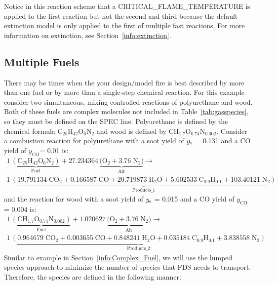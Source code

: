 \documentclass[11pt]{book}
\begin{document}
Notice in this reaction scheme that a {\ct CRITICAL\_FLAME\_TEMPERATURE} is applied to the first reaction but not the second and third because the default extinction model is only applied to the first of multiple fast reactions. For more information on extinction, see Section~\ref{info:extinction}.



\subsection{Multiple Fuels}
\label{info:multi-reac}
\label{energy_budget_adiabatic_two_fuels}

There may be times when the your design/model fire is best described by more than one fuel or by more than a single-step chemical reaction. For this example consider two simultaneous, mixing-controlled reactions of polyurethane and wood. Both of these fuels are complex molecules not included in Table~\ref{tab:gasspecies}, so they must be defined on the {\ct SPEC line}. Polyurethane is defined by the chemical formula C$_{25}$H$_{42}$O$_{6}$N$_{2}$ and wood is defined by CH$_{1.7}$O$_{0.74}$N$_{0.002}$. Consider a combustion reaction for polyurethane with a soot yield of $y_{\rm s}$ = 0.131 and a CO yield of $y_{\mathrm{CO}}$= 0.01 \cite{SFPE:Tewarson} is:
\begin{multline}\label{eq:pu_combust}
1\,\underbrace{\mathrm{(C_{25}H_{42}O_{6}N_{2})}}_\text{Fuel} + 27.234364\,\underbrace{\mathrm{(O_2 + 3.76 \; N_2})}_\text{Air} \longrightarrow \\
1\,\underbrace{\mathrm{(19.791134\; CO_2 + 0.166587 \; CO + 20.719873 \; H_2O + 5.602533\; C_{0.9}H_{0.1} + 103.40121 \; N_2)}}_\text{Products\_1}
\end{multline}
and the reaction for wood with a soot yield of $y_{\rm s}$ = 0.015 and a CO yield of $y_{\mathrm{CO}}$= 0.004 \cite{SFPE:Tewarson} is:
\begin{multline}\label{eq:wood_combust}
1\,\underbrace{\mathrm{(CH_{1.7}O_{0.74}N_{0.002})}}_\text{Fuel} + 1.020627\,\underbrace{\mathrm{(O_2 + 3.76 \; N_2})}_\text{Air} \longrightarrow \\
1\,\underbrace{\mathrm{(0.964679\; CO_2 + 0.003655 \; CO + 0.848241 \; H_2O + 0.035184\; C_{0.9}H_{0.1} + 3.838558 \; N_2)}}_\text{Products\_2}
\end{multline}
Similar to example in Section~\ref{info:Complex_Fuel}, we will use the lumped species approach to minimize the number of species that FDS needs to transport. Therefore, the species are defined in the following manner:
\end{document}
